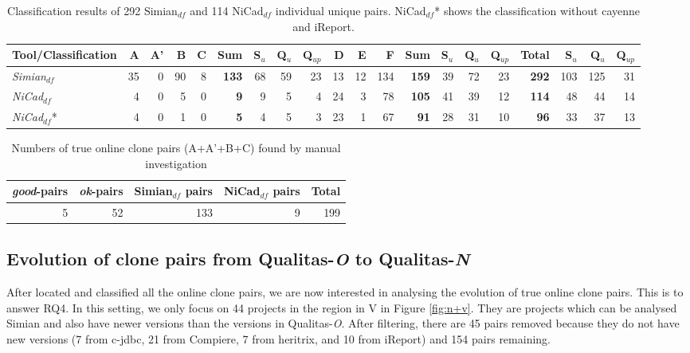 \documentclass{IEEEtran}
\begin{document}
\begin{table}[H]
	\centering
	\caption{Classification results of 292 Simian$_{\mathrm{\textit{df}}}$ and 114 NiCad$_{\mathrm{\textit{df}}}$ individual unique pairs. NiCad$_{\mathrm{\textit{df}}}$* shows the classification without cayenne and iReport.}
	\label{tab:classification_indv}
	\begin{tabular}{|l|r|r|r|r|r|r|r|r|r|r|r|r|r|r|r|r|r|r|r|}
		\hline 
		Tool/Classification & A & A' & B & C & \textbf{Sum} & S$_{u}$ & Q$_{u}$ & Q$_{up}$ & D & E & F & \textbf{Sum}  & S$_{u}$ & Q$_{u}$ & Q$_{up}$ & \textbf{Total} & S$_{u}$ & Q$_{u}$  & Q$_{up}$  \\ 
		\hline 
		\multirow{1}{*}{\textit{Simian$_{\mathrm{\textit{df}}}$}} & 35 & 0 & 90 & 8 & \textbf{133} & 68 & 59 & 23 & 13 & 12 & 134 & \textbf{159} & 39 & 72 & 23 & \textbf{292} & 103 & 125 & 31 \\
		\hline
		\multirow{1}{*}{\textit{NiCad$_{\mathrm{\textit{df}}}$}} & 4  & 0 & 5 & 0 & \textbf{9} & 9 & 5 & 4 & 24 & 3 & 78 & \textbf{105} & 41 & 39 & 12 & \textbf{114} & 48 & 44 & 14 \\ 
		\hline
		\multirow{1}{*}{\textit{NiCad$_{\mathrm{\textit{df}}}$}*} & 4  & 0 & 1 & 0 & \textbf{5} & 4 & 5 & 3 & 23 & 1 & 67 & \textbf{91} & 28 & 31 & 10 & \textbf{96} & 33 & 37 & 13 \\ 
		\hline
	\end{tabular} 
\end{table}

\begin{table}[H]
	\centering
	\caption{Numbers of true online clone pairs (A+A'+B+C) found by manual investigation}
	\label{tab:classification_indv_summary}
	\begin{tabular}{r|r|r|r|r}
		\hline 
		\textit{good}-pairs & \textit{ok}-pairs & Simian$_{\mathrm{\textit{df}}}$ pairs & NiCad$_{\mathrm{\textit{df}}}$ pairs & Total \\ 
		\hline 
		5 & 52 & 133 & 9 & 199 \\
		\hline
	\end{tabular} 
\end{table}


\subsection{Evolution of clone pairs from Qualitas-\textit{O} to Qualitas-\textit{N}}
After located and classified all the online clone pairs, we are now interested in analysing the evolution of true online clone pairs. This is to answer RQ4. In this setting, we only focus on 44 projects in the region in V in Figure \ref{fig:n+v}. They are projects which can be analysed Simian and also have newer versions than the versions in Qualitas-\textit{O}. After filtering, there are 45 pairs removed because they do not have new versions (7 from c-jdbc, 21 from Compiere, 7 from heritrix, and 10 from iReport) and 154 pairs remaining.
\end{document}
